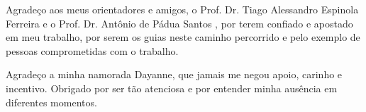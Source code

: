 \begin{agradecimentos}
Agradeço aos meus orientadores e amigos, o Prof. Dr. Tiago Alessandro Espinola Ferreira e o Prof. Dr. Antônio de Pádua Santos , por terem confiado e apostado em meu trabalho, por serem os guias neste caminho percorrido e pelo exemplo de pessoas comprometidas com o trabalho.

Agradeço a minha namorada Dayanne, que jamais me negou apoio, carinho e incentivo. Obrigado por ser tão atenciosa e por entender minha ausência em diferentes momentos.


\end{agradecimentos}
